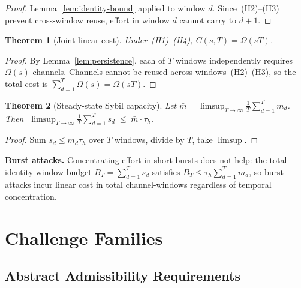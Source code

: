 \documentclass[11pt]{article}
\newtheorem{theorem}{Theorem}
\theoremstyle{remark}
\theoremstyle{plain}
\begin{document}
	\begin{proof}
		Lemma~\ref{lem:identity-bound} applied to window $d$. Since~(H2)--(H3)
		prevent cross-window reuse, effort in window $d$ cannot carry to $d+1$.
	\end{proof}
	
	\begin{theorem}[Joint linear cost]
		\label{thm:joint-linear}
		Under~(H1)--(H4), $C(s,T) = \Omega(sT)$.
	\end{theorem}
	
	\begin{proof}
		By Lemma~\ref{lem:persistence}, each of $T$ windows independently
		requires $\Omega(s)$ channels. Channels cannot be reused across
		windows~(H2)--(H3), so the total cost is
		$\sum_{d=1}^{T}\Omega(s) = \Omega(sT)$.
	\end{proof}
	
	\begin{theorem}[Steady-state Sybil capacity]
		\label{thm:steady-state}
		Let $\bar{m} = \limsup_{T\to\infty}\frac{1}{T}\sum_{d=1}^{T}m_d$.
		Then $\;\limsup_{T\to\infty}\frac{1}{T}\sum_{d=1}^{T}s_d
		\;\le\; \bar{m}\cdot\tau_h$.
	\end{theorem}
	
	\begin{proof}
		Sum $s_d \le m_d\tau_h$ over $T$ windows, divide by $T$, take
		$\limsup$.
	\end{proof}
	
	\noindent\textbf{Burst attacks.}
	Concentrating effort in short bursts does not help: the total
	identity-window budget $B_T = \sum_{d=1}^T s_d$ satisfies
	$B_T \le \tau_h\sum_{d=1}^T m_d$, so burst attacks incur linear
	cost in total channel-windows regardless of temporal concentration.
	
	
	\section{Challenge Families}
	\label{sec:challenges}
	
	\subsection{Abstract Admissibility Requirements}
	
\end{document}
